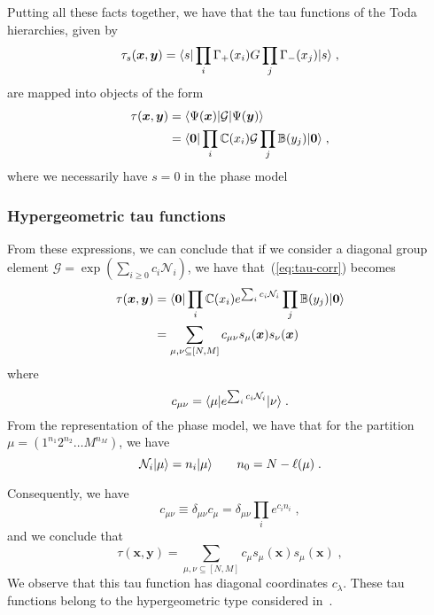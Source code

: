 \documentclass[a4paper,11pt]{amsart}
\begin{document}
Putting all these facts together, we have that the tau functions of the Toda 
hierarchies, given by
\begin{equation}
  \tau_s(\bm{x}, \bm{y}) = \langle s\rvert \prod_{i} \Gamma_+(x_i) G \prod_j \Gamma_-(x_j) \lvert s\rangle\; ,
\end{equation}
are mapped into objects of the form 
\begin{equation}
\label{eq:tau-corr}
\begin{split}
  \tau(\bm{x}, \bm{y}) & = \langle\Psi(\bm{x})\rvert \mathcal{G} \lvert\Psi(\bm{y})\rangle \\
  & = \langle\bm{0}\rvert \prod_{i} \mathbb{C}(x_i)
  \mathcal{G} \prod_j \mathbb{B}(y_j) \lvert\bm{0}\rangle\; ,
\end{split}
\end{equation}
where we necessarily have \(s=0\) in the phase model


\subsubsection{Hypergeometric tau functions}
From these expressions, we can conclude that if we consider a diagonal
group element \(\mathcal{G} = \exp \left( \sum_{i\geq 0} c_i
\mathcal{N}_i\right)\), we have that~(\ref{eq:tau-corr}) becomes
\begin{equation}
\begin{split}
  \tau(\bm{x}, \bm{y}) 
  & = \langle\bm{0}\rvert \prod_{i} \mathbb{C}(x_i)
  e^{\sum_i c_i \mathcal{N}_i} \prod_j \mathbb{B}(y_j) \lvert\bm{0}\rangle\\
  & = \sum_{\mu, \nu \subseteq [N,M]} c_{\mu\nu} s_\mu(\bm{x}) s_\nu(\bm{x})
\end{split}
\end{equation}
where
\begin{equation}
  c_{\mu \nu} = \langle\mu\rvert e^{\sum_i c_i \mathcal{N}_i}\lvert\nu\rangle \; .
\end{equation}
From the representation of the phase model, we have that for the partition
\(\mu = (1^{n_1} 2^{n_2} \dots M^{n_M})\), we have
\begin{equation}
  \mathcal{N}_i \lvert\mu\rangle = n_i \lvert\mu\rangle \qquad n_0 = N - \ell(\mu)\; .
\end{equation}

Consequently, we have
\begin{equation}
  c_{\mu \nu} \equiv \delta_{\mu\nu} c_{\mu}  =  \delta_{\mu\nu} \prod_i e^{c_i n_i}\; , 
\end{equation}
and we conclude that 
\begin{equation}
  \tau(\bm{x}, \bm{y}) 
  = \sum_{\mu, \nu \subseteq [N,M]} c_{\mu} s_\mu(\bm{x}) s_\mu(\bm{x})\; ,
\end{equation}
We observe that this tau function has diagonal coordinates
\(c_\lambda\). These tau functions belong to the hypergeometric type
considered in~\cite{Orlov:2000, orlov:2001, Orlov:2001b, Orlov:2005}.
\end{document}
